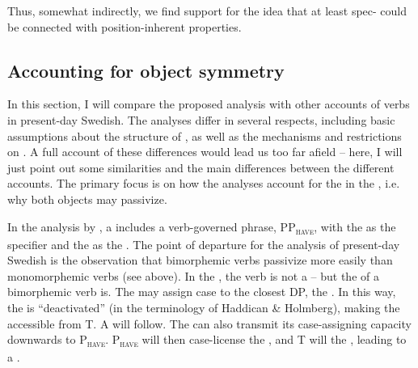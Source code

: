 \documentclass[output=paper]{langscibook}
\begin{document}
\z
\z

Thus, somewhat indirectly, we find support for the idea that at least spec- could be connected with position-inherent properties.

\subsection{Accounting for object symmetry}\label{sec:falk:4.5}


In this section, I will compare the proposed analysis with other accounts of  verbs in present-day Swedish. The analyses differ in several respects, including basic assumptions about the structure of , as well as the mechanisms and restrictions on . A full account of these differences would lead us too far afield – here, I will just point out some similarities and the main differences between the different accounts. The primary focus is on how the analyses account for the  in the , i.e. why both objects may passivize.


In the analysis by \citet{HaddicanHolmberg2019}, a  includes a verb-governed phrase, PP\textsc{\textsubscript{have}}, with the  as the specifier and the  as the . The point of departure for the analysis of present-day Swedish is the observation that bimorphemic  verbs passivize more easily than monomorphemic  verbs (see  above). In the , the verb is not a  – but the  of a bimorphemic verb is. The  may assign case to the closest DP, the . In this way, the  is “deactivated” (in the terminology of Haddican \& Holmberg), making the  accessible from T. A  will follow. The  can also transmit its case-assigning capacity downwards to P\textsc{\textsubscript{have}}. P\textsc{\textsubscript{have}} will then case-license the , and T will  the , leading to a .
\end{document}

